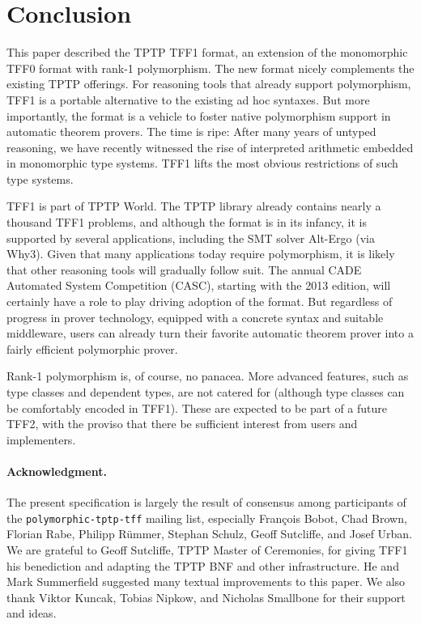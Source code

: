 \section{Conclusion}
\label{sec_concl}

This paper described the TPTP TFF1 format, an extension of the monomorphic TFF0 format
with rank-1 polymorphism. The new format nicely complements the existing TPTP
offerings. %
For reasoning tools that already
support polymorphism, TFF1 is a portable alternative to the existing ad hoc
syntaxes. But more importantly, the format is a vehicle to foster native
polymorphism support in automatic theorem provers. The time is ripe: After many
years of untyped reasoning, we have recently witnessed the rise of
interpreted arithmetic embedded in monomorphic type systems. TFF1
lifts the most obvious restrictions of such type systems.

TFF1 is part of TPTP World. The TPTP library already contains
nearly a thousand TFF1 problems, and although the format is in its
infancy, it is supported by several applications, including the SMT solver
Alt-Ergo (via Why3).
Given that many applications today require polymorphism, it
is likely that other reasoning tools will gradually follow suit.
The annual CADE Automated
System Competition (CASC), starting with the 2013 edition, will certainly have a
role to play driving adoption of the format. But regardless of progress in
prover technology, equipped with a concrete syntax and suitable middleware,
users can already turn their favorite automatic theorem prover into a
fairly efficient polymorphic prover.

Rank-1 polymorphism is, of course, no panacea. More advanced features, such as
type classes and dependent types, are not catered for (although type
classes can be comfortably encoded in TFF1). These are expected to be
part of a future TFF2, with the proviso that there be sufficient interest from
users and implementers.

\def\ackname{Acknowledgment}
\paragraph{\textbf{\upshape\ackname.}}
%
The present specification is largely the result of consensus among
participants of the {\tt polymorphic-tptp-tff} mailing list, especially
Fran\c{c}ois Bobot, Chad Brown, Florian Rabe, Philipp R\"ummer, Stephan Schulz,
Geoff Sutcliffe, and Josef Urban.
We are grateful to Geoff Sutcliffe, TPTP Master of Ceremonies, for giving TFF1
his benediction and adapting the TPTP BNF and other infrastructure.
He and Mark Summerfield suggested many textual improvements to this paper.
We also thank Viktor Kuncak, Tobias Nipkow, and Nicholas Smallbone for their
support and ideas.
